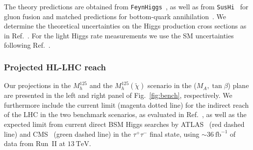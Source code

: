 The theory predictions are obtained from
\texttt{FeynHiggs}~\cite{Heinemeyer:1998yj,Heinemeyer:1998np,Degrassi:2002fi,Frank:2006yh,Hahn:2013ria,Bahl:2016brp,Bahl:2017aev,Bahl:2018qog},
as well as from \texttt{SusHi}~\cite{Harlander:2012pb, Harlander:2016hcx,
Harlander:2005rq,Harlander:2002wh,
Harlander:2002vv,Anastasiou:2014lda,Anastasiou:2015yha,
Anastasiou:2016cez,Degrassi:2010eu, Degrassi:2011vq,
Degrassi:2012vt,Actis:2008ug}
for gluon fusion and matched predictions for bottom-quark
annihilation~\cite{Bonvini:2015pxa,Bonvini:2016fgf,Forte:2015hba, Forte:2016sja}. We determine the theoretical uncertainties on the Higgs production cross sections as in Ref.~\cite{Bahl:2018zmf}. 
For the light Higgs rate measurements we use the SM uncertainties following Ref.~\cite{deFlorian:2016spz}.

\subsubsection*{Projected HL-LHC reach}
 
Our projections in the $M_h^{125}$ and the $M_h^{125}(\tilde{\chi})$ scenario in the
($M_A, \tan\beta$) plane are presented in the left and right panel of Fig.~\ref{fig:bench}, respectively. 
We furthermore include the current limit (magenta dotted line) for the indirect reach of the LHC in the two benchmark scenarios, as evaluated in Ref.~\cite{Bahl:2018zmf}, as well as the expected limit from current direct BSM Higgs searches by ATLAS~\cite{Aaboud:2017sjh} (red dashed line) and CMS~\cite{Sirunyan:2018zut} (green dashed line) in the $\tau^+\tau^-$ final state, using $\sim 36~\mathrm{fb}^{-1}$ of data from Run~II at $13~\mathrm{TeV}$.

